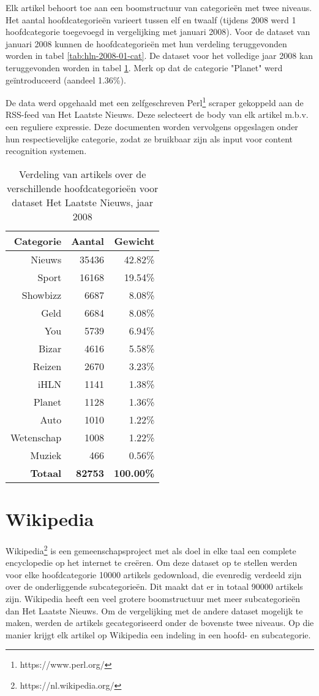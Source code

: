 Elk artikel behoort toe aan een boomstructuur van categorie\"en met twee niveaus. Het aantal hoofdcategorie\"en varieert tussen elf en twaalf (tijdens 2008 werd 1 hoofdcategorie toegevoegd in vergelijking met januari 2008). Voor de dataset van januari 2008 kunnen de hoofdcategorie\"en met hun verdeling teruggevonden worden in tabel \ref{tab:hln-2008-01-cat}. De dataset voor het volledige jaar 2008 kan teruggevonden worden in tabel \ref{tab:hln-2008-cat}. Merk op dat de categorie "Planet" werd ge\"introduceerd (aandeel 1.36\%).

De data werd opgehaald met een zelfgeschreven Perl\footnote{https://www.perl.org/} scraper gekoppeld aan de RSS-feed van Het Laatste Nieuws. Deze selecteert de body van elk artikel m.b.v. een reguliere expressie. Deze documenten worden vervolgens opgeslagen onder hun respectievelijke categorie, zodat ze bruikbaar zijn als input voor content recognition systemen. 

\begin{table}[htbp]
	\centering
	\caption{Verdeling van artikels over de verschillende hoofdcategorie\"en voor dataset Het Laatste Nieuws, jaar 2008}
	\begin{tabular}{rrr}
		\toprule
		Categorie & Aantal & Gewicht \\
		\midrule
		Nieuws & 35436 & 42.82\% \\
		Sport & 16168 & 19.54\% \\
		Showbizz & 6687  & 8.08\% \\
		Geld  & 6684  & 8.08\% \\
		You   & 5739  & 6.94\% \\
		Bizar & 4616  & 5.58\% \\
		Reizen & 2670  & 3.23\% \\
		iHLN  & 1141  & 1.38\% \\
		Planet & 1128  & 1.36\% \\
		Auto  & 1010  & 1.22\% \\
		Wetenschap & 1008  & 1.22\% \\
		Muziek & 466   & 0.56\% \\
		\textbf{Totaal} & \textbf{82753} & \textbf{100.00\%} \\
		\bottomrule
	\end{tabular}%
	\label{tab:hln-2008-cat}%
\end{table}%

\section{Wikipedia}
Wikipedia\footnote{https://nl.wikipedia.org/} is een gemeenschapsproject met als doel in elke taal een complete encyclopedie op het internet te cre\"eren. Om deze dataset op te stellen werden voor elke hoofdcategorie 10000 artikels gedownload, die evenredig verdeeld zijn over de onderliggende subcategorie\"en. Dit maakt dat er in totaal 90000 artikels zijn. Wikipedia heeft een veel grotere boomstructuur met meer subcategorie\"en dan Het Laatste Nieuws. Om de vergelijking met de andere dataset mogelijk te maken, werden de artikels  gecategoriseerd onder de bovenste twee niveaus. Op die manier krijgt elk artikel op Wikipedia een indeling in een hoofd- en subcategorie. 

